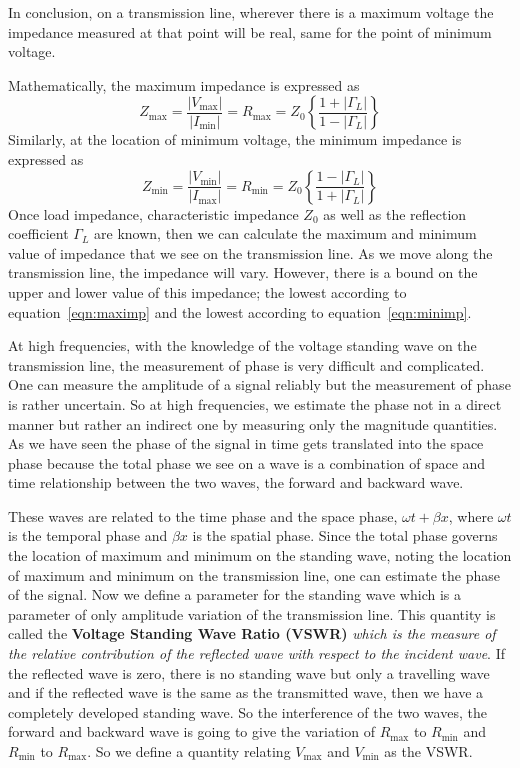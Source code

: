 In conclusion, on a transmission line, wherever there is a maximum voltage the impedance measured at that point will be real, same for the point of minimum voltage.

Mathematically, the maximum impedance is expressed as
\begin{dmath}
Z_{\max} = \frac{|V_{\max}|}{|I_{\min}|} 
= R_{\max}
= Z_0\left\{\frac{1+|\Gamma_L|}{1-|\Gamma_L|}\right\}
\label{eqn:maximp}
\end{dmath}
Similarly, at the location of minimum voltage, the minimum impedance is expressed as
\begin{dmath}
Z_{\min}=\frac{|V_{\min}|}{|I_{\max}|} 
= R_{\min}=Z_0\left\{\frac{1-|\Gamma_L|}{1+|\Gamma_L|} \right\}
\label{eqn:minimp}
\end{dmath}
Once load impedance, characteristic impedance $Z_0$ as well as the reflection coefficient $\Gamma_L$ are known, then we can calculate the maximum and minimum value of impedance that we see on the transmission line. As we move along the transmission line, the impedance will vary. However, there is a bound on the upper and lower value of this impedance; the lowest according to equation~\eqref{eqn:maximp} and the lowest according to equation~\eqref{eqn:minimp}.

At high frequencies, with the knowledge of the voltage standing wave on the transmission line, the measurement of phase is very difficult and complicated. One can measure the amplitude of a signal reliably but the measurement of phase is rather uncertain. So at high frequencies, we estimate the phase not in a direct manner but rather an indirect one by measuring only the magnitude quantities. As we have seen the phase of the signal in time gets translated into the space phase because the total phase we see on a wave is a combination of space and time relationship between the two waves, the forward and backward wave. 

These waves are related to the time phase and the space phase, $\omega t + \beta x$, where $\omega t$ is the temporal phase and $\beta x$ is the spatial phase. Since the total phase governs the location of maximum and minimum on the standing wave, noting the location of maximum and minimum on the transmission line, one can estimate the phase of the signal. Now we define a parameter for the standing wave which is a parameter of only amplitude variation of the transmission line. This quantity is called the \textbf{Voltage Standing Wave Ratio (VSWR)} \emph{which is the measure of the relative contribution of the reflected wave with respect to the incident wave}. If the reflected wave is zero, there is no standing wave but only a travelling wave and if the reflected wave is the same as the transmitted wave, then we have a completely developed standing wave. So the interference of the two waves, the forward and backward wave is going to give the variation of $R_{\max}$ to $R_{\min}$ and $R_{\min}$ to $R_{\max}$. So we define a quantity relating $V_{\max}$ and $V_{\min}$ as the VSWR.

